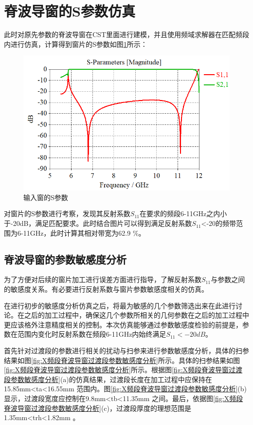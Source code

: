 \documentclass[master]{thesis-uestc}
\begin{document}
\section{脊波导窗的S参数仿真}
此时对原先参数的脊波导窗在CST里面进行建模，并且使用频域求解器在匹配频段内进行仿真，计算得到窗片的S参数如图\ref{fig:输入窗的S参数}所示：

\begin{figure}[!htb]
    \centering
    \includegraphics[width=0.5\linewidth]{pic/chapter3/脊波导窗S参数.png}
    \caption{输入窗的S参数}
    \label{fig:输入窗的S参数}
\end{figure}
对窗片的S参数进行考察，发现其反射系数$S_{11}$在要求的频段6-11GHz之内小于-20dB，满足匹配要求。此时结合图片可以得到满足反射系数$S_{11}$<-20的频带范围为6-11GHz，此时计算其相对带宽为62.9 \%。

\subsection{脊波导窗的参数敏感度分析}\label{subsec:脊波导窗的参数敏感度分析}
为了方便对后续的窗片加工进行误差方面进行指导，了解反射系数\(S_{11}\)与参数之间的敏感度关系。有必要进行反射系数与窗片参数敏感度相关的仿真。

在进行初步的敏感度分析仿真之后，将最为敏感的几个参数筛选出来在此进行讨论。在之后的加工过程中，确保这几个参数所相关的几何参数在之后的加工过程中更应该格外注意精度相关的控制。本次仿真能够通过参数敏感度检验的前提是，参数在范围内变化时反射系数在频段6-11GHz内始终满足\(S_{11}<-20dB\)。

首先针对过渡段的参数进行相关的扰动与扫参来进行参数敏感度分析，具体的扫参结果如图\ref{fig:X频段脊波导窗过渡段参数敏感度分析}所示。具体的扫参结果如图\ref{fig:X频段脊波导窗过渡段参数敏感度分析}所示。根据图\ref{fig:X频段脊波导窗过渡段参数敏感度分析}(a)的仿真结果，过渡段长度在加工过程中应保持在15.85mm<ta<16.55mm 范围内。图\ref{fig:X频段脊波导窗过渡段参数敏感度分析}(b)显示，过渡段宽度应控制在9.8mm<tb<11.35mm 之间。最后，依据图\ref{fig:X频段脊波导窗过渡段参数敏感度分析}(c)，过渡段厚度的理想范围是1.35mm<trh<1.82mm 。
\end{document}
